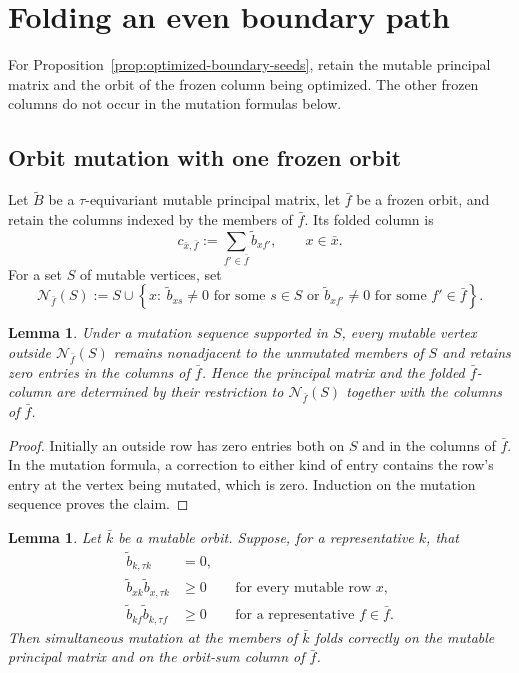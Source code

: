 \documentclass[11pt]{amsart}
\newtheorem{lemma}[theorem]{Lemma}
\theoremstyle{definition}
\theoremstyle{remark}
\begin{document}
\section{Folding an even boundary path}
\label{app:even-boundary-path}

For Proposition~\ref{prop:optimized-boundary-seeds}, retain the mutable
principal matrix and the orbit of the frozen column being optimized.  The
other frozen columns do not occur in the mutation formulas below.

\subsection{Orbit mutation with one frozen orbit}

Let $\widetilde B$ be a $\tau$-equivariant mutable principal matrix, let
$\bar f$ be a frozen orbit, and retain the columns indexed by the members of
$\bar f$.  Its folded column is
\[ c_{\bar x,\bar f}:=\sum_{f'\in\bar f}\widetilde b_{x f'}, \qquad x\in\bar x. \]
For a set $S$ of mutable vertices, set
\[ \mathcal N_{\bar f}(S) :=S\cup\left\{x:\ \widetilde b_{xs}\ne0\text{ for some }s\in S \text{ or } \widetilde b_{x f'}\ne0\text{ for some }f'\in\bar f\right\}. \]

\begin{lemma}\label{lem:frozen-column-locality}
Under a mutation sequence supported in $S$, every mutable vertex outside
$\mathcal N_{\bar f}(S)$ remains nonadjacent to the unmutated members of
$S$ and retains zero entries in the columns of $\bar f$.  Hence the
principal matrix and the folded $\bar f$-column are determined by their
restriction to $\mathcal N_{\bar f}(S)$ together with the columns of $\bar f$.
\end{lemma}

\begin{proof}
Initially an outside row has zero entries both on $S$ and in the columns
of $\bar f$.  In the mutation formula, a correction to either kind of entry
contains the row's entry at the vertex being mutated, which is zero.
Induction on the mutation sequence proves the claim.
\end{proof}

\begin{lemma}\label{lem:frozen-column-orbit-mutation}
Let $\bar k$ be a mutable orbit.  Suppose, for a representative $k$, that
\begin{align}
 \widetilde b_{k,\tau k}&=0,
 \label{eq:frozen-fold-no-orbit-arrow}\\
 \widetilde b_{xk}\widetilde b_{x,\tau k}&\ge0
 &&\text{for every mutable row }x,
 \label{eq:frozen-fold-row-sign}\\
 \widetilde b_{k f}\widetilde b_{k,\tau f}&\ge0
 &&\text{for a representative }f\in\bar f.
 \label{eq:frozen-fold-column-sign}
\end{align}
Then simultaneous mutation at the members of $\bar k$ folds correctly on
the mutable principal matrix and on the orbit-sum column of $\bar f$.
\end{lemma}
\end{document}
